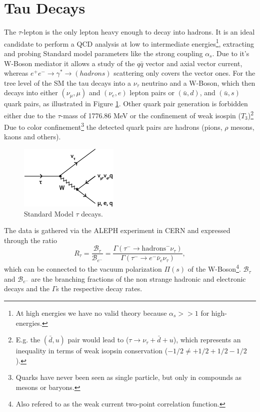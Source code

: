 \section{Tau Decays}\label{tauDecays}
The $\tau$-lepton is the only lepton heavy enough to decay into hadrons. It is an ideal candidate to perform a QCD analysis at low to intermediate energies\footnote{At high energies we have no valid theory because $\alpha_s>>1$ for high-energies.}, extracting and probing Standard model parameters like the strong coupling $\alpha_s$. Due to it's W-Boson mediator it allows a study of the $q\bar q$ vector and axial vector current, whereas $e^+e^-\to\gamma^*\to (hadrons)$ scattering only covers the vector ones.
For the tree level of the SM the tau decays into a $\nu_\tau$ neutrino and a W-Boson, which then decays into either $(\nu_\mu, \mu)$ and $(\nu_e, e)$ lepton pairs or $(\bar u, d)$, and $(\bar u, s)$ quark pairs, as illustrated in Figure \ref{fig:tauDecay}. Other quark pair generation is forbidden either due to the $\tau$-mass of 1776.86 MeV \cite{Olive2014} or the confinement of weak isospin ($T_3$)\footnote{E.g. the $(\bar d, u)$ pair would lead to ($\tau \to \nu_\tau + \bar d + u$), which represents an inequality in terms of weak isopsin conservation ($-1/2 \neq +1/2 + 1/2 - 1/2$).} Due to color confinement\footnote{Quarks have never been seen as single particle, but only in compounds as mesons or baryons.} the detected quark pairs are hadrons (pions, $\rho$ mesons, kaons and others).

\begin{figure}[h]
	\centering
	\includegraphics{img/tauDecay.png}
	\caption{Standard Model $\tau$ decays.}
	\label{fig:tauDecay}
\end{figure}

The data is gathered via the ALEPH experiment in CERN and expressed through the ratio
\begin{equation}
  R_\tau = \frac{\mathcal{B}_\tau}{\mathcal{B}_{e^-}} = \frac{\Gamma(\tau^- \to \text{hadrons}^- \nu_\tau)}{\Gamma(\tau^- \to e^- \bar \nu_e \nu_\tau)},
\end{equation}		
which can be connected to the vacuum polarization $\Pi(s)$ of the W-Boson\footnote{Also refered to as the weak current two-point correlation function.}. $\mathcal{B}_\tau$ and $\mathcal{B}_{e^-}$ are the branching fractions of the non strange hadronic and electronic decays and the $\Gamma$s the respective decay rates.

